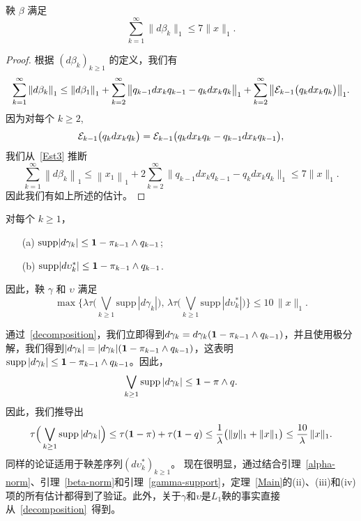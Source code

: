 \begin{lemma}\label{beta-norm}
鞅 $\beta$ 满足 $$\sum_{k=1}^\infty
\|d\beta_k\|_1 \leq 7\|x\|_1.$$
\end{lemma}

\begin{proof}
根据 $(d\beta_k)_{k \ge 1}$ 的定义，我们有
\[
\sum_{k=1}^{\infty} \left\|d\beta_k\right\|_1 \le
\left\|d\beta_1\right\|_1 + \sum_{k=2}^{\infty} \big\| q_{k-1}
dx_k q_{k-1} - q_k dx_k q_k \big\|_1 + \sum_{k=2}^{\infty} \big\|
\mathcal{E}_{k-1} \big( q_k dx_k q_k \big) \big\|_1.
\]
因为对每个 $k\geq 2$, $$\mathcal{E}_{k-1} \big( q_k dx_k q_k
\big) = \mathcal{E}_{k-1} \big( q_k dx_k q_k - q_{k-1} dx_k q_{k-1}
\big),$$  我们从~\eqref{Est3} 推断
\[
\sum_{k=1}^{\infty} \left\|d\beta_k\right\|_1 \le
\left\|x_1\right\|_1 + 2 \sum_{k=2}^{\infty} \big\| q_{k-1} dx_k
q_{k-1} - q_k dx_k q_k \big\|_1 \le 7 \|x\|_1.
\]
因此我们有如上所述的估计。
\end{proof}

\begin{lemma}\label{gamma-support}
对每个 $k\geq 1$，
\begin{itemize}
\item[(a)]$\mathrm{supp} |d\gamma_k| \leq {\bf 1}- \pi_{k-1}
\wedge q_{k-1}$;
\item[(b)] $\mathrm{supp} |d\upsilon_k^*| \leq {\bf 1}-
\pi_{k-1} \wedge q_{k-1}$.
\end{itemize}
因此，鞅 $\gamma$ 和 $\upsilon$ 满足
$$\max \Big\{ \lambda \tau \Big( \bigvee_{k \ge 1} \mathrm{supp}
\, |d\gamma_k| \Big), \, \lambda \tau \Big( \bigvee_{k \ge 1}
\mathrm{supp} \, |d\upsilon_k^*| \Big) \Big\} \le 10 \, \|x\|_1.$$
\end{lemma}
  
\dem
通过~\eqref{decomposition}，我们立即得到$d\gamma_k=d\gamma_k({\bf 1}-\pi_{k-1}\wedge q_{k-1})$，并且使用极分解，我们得到$|d\gamma_k|=|d\gamma_k|({\bf
1}-\pi_{k-1}\wedge q_{k-1})$，这表明$\mathrm{supp} \,
|d\gamma_k| \leq {\bf 1}- \pi_{k-1} \wedge q_{k-1}$。因此，
\[
\bigvee_{k\geq 1} \mathrm{supp} \, |d\gamma_k| \leq {\bf 1}- \pi
\wedge q.\] 因此，我们推导出
$$\tau \Big( \bigvee_{k\geq 1}
\mathrm{supp} \, |d\gamma_k| \Big) \leq \tau({\bf 1}- \pi) + \tau({\bf
1}-q) \leq \frac{1}{\lambda} \big( \|y\|_1 + \|x\|_1 \big) \leq
\frac{10}{\lambda} \, \|x\|_1.$$ 同样的论证适用于鞅差序列$(d\upsilon^*_k)_{k \ge 1}$。
\fin
现在很明显，通过结合引理~\ref{alpha-norm}、引理~\ref{beta-norm}和引理~\ref{gamma-support}，定理~\ref{Main}的(ii)、(iii)和(iv)项的所有估计都得到了验证。此外，关于$\gamma$和$\upsilon$是$L_1$鞅的事实直接从~\eqref{decomposition}~得到。
\fin

